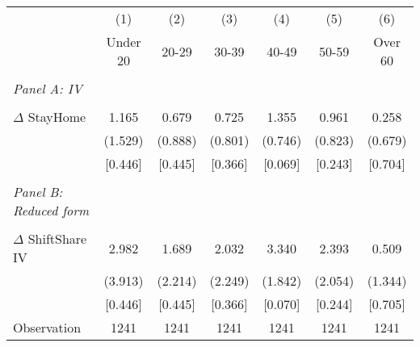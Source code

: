 \begin{tabular}{l*{6}{c}} \toprule
                    &\multicolumn{1}{c}{(1)}&\multicolumn{1}{c}{(2)}&\multicolumn{1}{c}{(3)}&\multicolumn{1}{c}{(4)}&\multicolumn{1}{c}{(5)}&\multicolumn{1}{c}{(6)}\\
                    &    Under 20&       20-29&       30-39&       40-49&       50-59&     Over 60\\
\hline \\ \multicolumn{1}{l}{\textit{Panel A: IV}} \\\\[-1ex]
$\Delta$ StayHome   &       1.165&       0.679&       0.725&       1.355&       0.961&       0.258\\
                    &     (1.529)&     (0.888)&     (0.801)&     (0.746)&     (0.823)&     (0.679)\\
                    &     [0.446]&     [0.445]&     [0.366]&     [0.069]&     [0.243]&     [0.704]\\
\hline \\ \multicolumn{1}{l}{\textit{Panel B: Reduced form}} \\\\[-1ex]
$\Delta$ ShiftShare IV&       2.982&       1.689&       2.032&       3.340&       2.393&       0.509\\
                    &     (3.913)&     (2.214)&     (2.249)&     (1.842)&     (2.054)&     (1.344)\\
                    &     [0.446]&     [0.445]&     [0.366]&     [0.070]&     [0.244]&     [0.705]\\
\hline
Observation         &        1241&        1241&        1241&        1241&        1241&        1241\\
\bottomrule \end{tabular}
